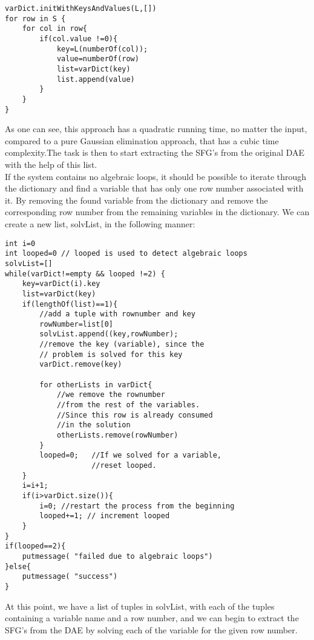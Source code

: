 \begin{lstlisting}
varDict.initWithKeysAndValues(L,[])
for row in S {
	for col in row{
		if(col.value !=0){
			key=L(numberOf(col));
			value=numberOf(row)
			list=varDict(key)
			list.append(value)		
		}
	}			
}
\end{lstlisting}
As one can see, this approach has a quadratic running time, no matter the input, compared to a pure Gaussian elimination approach, that has a cubic time complexity.The task is then to start extracting the SFG's from the original DAE with the help of this list.\\\newline If the system contains no algebraic loops, it should be possible to iterate through the dictionary and find a variable that has only one row number associated with it. By removing the found variable from the dictionary and remove the corresponding row number from the remaining variables in the dictionary. We can create a  new list, solvList, in the following manner:
\begin{lstlisting}
int i=0
int looped=0 // looped is used to detect algebraic loops
solvList=[]
while(varDict!=empty && looped !=2) {
	key=varDict(i).key
	list=varDict(key)
	if(lengthOf(list)==1){
		//add a tuple with rownumber and key
		rowNumber=list[0]
		solvList.append((key,rowNumber);
		//remove the key (variable), since the
		// problem is solved for this key
		varDict.remove(key)
		
		for otherLists in varDict{
			//we remove the rownumber 
			//from the rest of the variables.
			//Since this row is already consumed
			//in the solution
			otherLists.remove(rowNumber)
		}
		looped=0; 	//If we solved for a variable, 
					//reset looped.
	}
	i=i+1;
	if(i>varDict.size()){
		i=0; //restart the process from the beginning
		looped+=1; // increment looped 	
	}			
}
if(looped==2){
	putmessage( "failed due to algebraic loops")
}else{
	putmessage( "success")
}

\end{lstlisting}
At this point, we have a list of tuples in solvList, with each of the tuples containing a variable name and a row number, and we can begin to extract the SFG's from the DAE by solving each of the variable for the given row number.